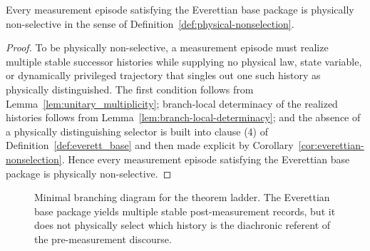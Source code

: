 \begin{theorem}
\label{thm:everett_nonselection}
Every measurement episode satisfying the Everettian base package is physically non-selective in the
sense of Definition~\ref{def:physical-nonselection}.
\end{theorem}

\begin{proof}
To be physically non-selective, a measurement episode must realize multiple stable successor histories
while supplying no physical law, state variable, or dynamically privileged trajectory that singles out
one such history as physically distinguished. The first condition follows from Lemma~\ref{lem:unitary_multiplicity};
branch-local determinacy of the realized histories follows from Lemma~\ref{lem:branch-local-determinacy};
and the absence of a physically distinguishing selector is built into clause (4) of
Definition~\ref{def:everett_base} and then made explicit by Corollary~\ref{cor:everettian-nonselection}.
Hence every measurement episode satisfying the Everettian base package is physically non-selective.
\end{proof}
\begin{figure}[htbp]
\centering
{}
\caption{Minimal branching diagram for the theorem ladder. The Everettian base package yields multiple stable post-measurement records, but it does not physically select which history is the diachronic referent of the pre-measurement discourse.}
\label{fig:minimal-branching}
\end{figure}

